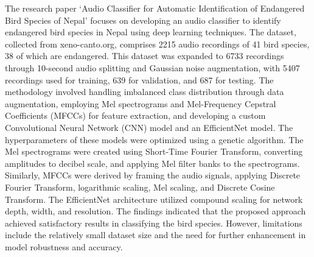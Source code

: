 The research paper `Audio Classifier for Automatic Identification of Endangered
Bird Species of Nepal' focuses on developing an audio classifier to identify
endangered bird species in Nepal using deep learning techniques. The dataset,
collected from xeno-canto.org, comprises 2215 audio recordings of 41 bird
species, 38 of which are endangered. This dataset was expanded to 6733
recordings through 10-second audio splitting and Gaussian noise augmentation,
with 5407 recordings used for training, 639 for validation, and 687 for
testing. The methodology involved handling imbalanced class distribution
through data augmentation, employing Mel spectrograms and Mel-Frequency
Cepstral Coefficients (MFCCs) for feature extraction, and developing a custom
Convolutional Neural Network (CNN) model and an EfficientNet model. The
hyperparameters of these models were optimized using a genetic algorithm. The
Mel spectrograms were created using Short-Time Fourier Transform, converting
amplitudes to decibel scale, and applying Mel filter banks to the spectrograms.
Similarly, MFCCs were derived by framing the audio signals, applying Discrete
Fourier Transform, logarithmic scaling, Mel scaling, and Discrete Cosine
Transform. The EfficientNet architecture utilized compound scaling for network
depth, width, and resolution. The findings indicated that the proposed approach
achieved satisfactory results in classifying the bird species. However,
limitations include the relatively small dataset size and the need for further
enhancement in model robustness and accuracy.\cite{gautam2023audio}

